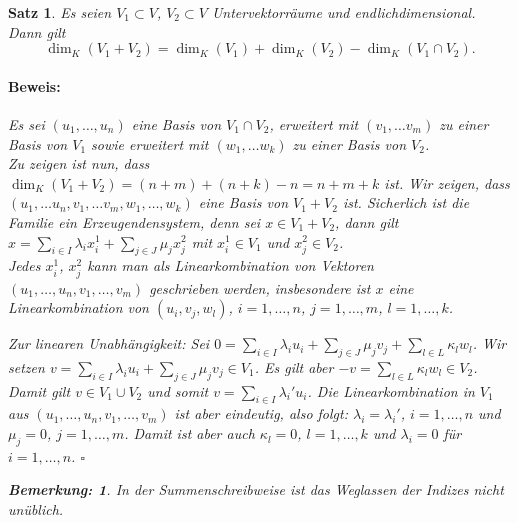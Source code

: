 \documentclass{report}
\newcommand{\lb}{\lambda}
\theoremstyle{customrem}
\newtheorem*{bem}{Bemerkung\textnormal:}
\theoremstyle{customdef}
\newtheorem{satz}[definition]{Satz}
\renewenvironment{proof}{\vspace{-.75cm}\paragraph{Beweis: }}{\vspace{-.5cm}\hfill$\square$}
\begin{document}
	\begin{satz}
		Es seien $V_1 \subset V$, $V_2 \subset V$ Untervektorräume und endlichdimensional. Dann gilt $$\dim_K(V_1 + V_2) = \dim_K(V_1) + \dim_K(V_2) - \dim_K(V_1 \cap V_2).$$
		
		\vspace{.25cm}
		\begin{proof}
			Es sei $(u_1, \ldots, u_n)$ eine Basis von $V_1\cap V_2$, erweitert mit $(v_1, \ldots v_m)$ zu einer Basis von $V_1$ sowie erweitert mit $(w_1, \ldots w_k)$ zu einer Basis von $V_2$. \\
			
			Zu zeigen ist nun, dass $\dim_K(V_1 + V_2) = (n+m) + (n+k) -n = n+m+k$ ist. Wir zeigen, dass $(u_1, \ldots u_n, v_1, \ldots v_m,  w_1, \ldots, w_k)$ eine Basis von $V_1 + V_2$ ist. Sicherlich ist die Familie ein Erzeugendensystem, denn sei $x\in V_1 + V_2$, dann gilt $x = \sum_{i\in I}\lb_i x_i^1 + \sum_{j\in J} \mu_j x_j^2$ mit $x_i^1\in V_1$ und $x_j^2\in V_2$.\\
			
			Jedes $x_i^1$, $x_j^2$ kann man als Linearkombination von Vektoren $(u_1,\ldots, u_n, v_1, \ldots, v_m)$ geschrieben werden, insbesondere ist $x$ eine Linearkombination von $(u_i, v_j, w_l)$, $i = 1,\ldots, n$, $j=1, \ldots, m$, $l = 1, \ldots, k$. 
			
			Zur linearen Unabhängigkeit: Sei $0=\sum_{i\in I}\lb_i u_i + \sum_{j\in J} \mu_j v_j + \sum_{l\in L} \kappa_l w_l$. Wir setzen $v = \sum_{i\in I} \lb_i u_i + \sum_{j \in J} \mu_j v_j\in V_1$. Es gilt aber $-v = \sum_{l\in L}\kappa_l w_l\in V_2$. Damit gilt $v\in V_1 \cup V_2$ und somit $v=\sum_{i\in I}\lb_i'u_i$. Die Linearkombination in $V_1$ aus $(u_1, \ldots, u_n, v_1, \ldots, v_m)$ ist aber eindeutig, also folgt: $\lb_i = \lb_i'$, $i = 1, \ldots, n$ und $\mu_j = 0$, $j =1, \ldots, m$. Damit ist aber auch $\kappa_l=0$, $l=1, \ldots, k$ und $\lb_i=0$ für $i=1, \ldots, n$.
		\end{proof}
		\vspace{.75cm}
		\begin{bem}
			In der Summenschreibweise ist das Weglassen der Indizes nicht unüblich.
		\end{bem}
	\end{satz}
	
\end{document}
